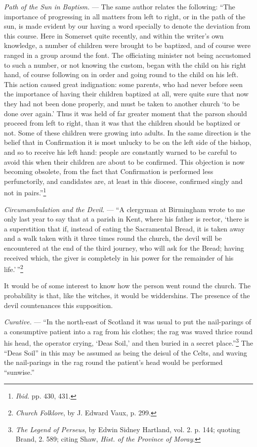 \documentclass[a4paper, 11pt, oneside, polutonikogreek, english]{article}
\begin{document}
\emph{Path of the Sun in Baptism.} --- The same author relates the following: ``The importance of progressing in all matters from left to right, or in the path of the sun, is made evident by our having a word specially to denote the deviation from this course. Here in Somerset quite recently, and within the writer's own knowledge, a number of children were brought to be baptized, and of course were ranged in a group around the font. The officiating minister not being accustomed to such a number, or not knowing the custom, began with the child on his right hand, of course following on in order and going round to the child on his left. This action caused great indignation: some parents, who had never before seen the importance of having their children baptized at all, were quite sure that now they had not been done properly, and must be taken to another church `to be done over again.' Thus it was held of far greater moment that the parson should proceed from left to right, than it was that the children should be baptized or not. Some of these children were growing into adults. In the same direction is the belief that in Confirmation it is most unlucky to be on the left side of the bishop, and so to receive his left hand: people are constantly warned to be careful to avoid this when their children are about to be confirmed. This objection is now becoming obsolete, from the fact that Confirmation is performed less perfunctorily, and candidates are, at least in this diocese, confirmed singly and not in pairs.''\footnote{\emph{Ibid.} pp. 430, 431.}

\emph{Circumambulation and the Devil.} --- ``A clergyman at Birmingham wrote to me only last year to say that at a parish in Kent, where his father is rector, `there is a superstition that if, instead of eating the Sacramental Bread, it is taken away and a walk taken with it three times round the church, the devil will be encountered at the end of the third journey, who will ask for the Bread; having received which, the giver is completely in his power for the remainder of his life.'\,''\footnote{\emph{Church Folklore}, by J. Edward Vaux, p. 299.}

It would be of some interest to know how the person went round the church. The probability is that, like the witches, it would be widdershins. The presence of the devil countenances this supposition.

\emph{Curative.} --- ``In the north-east of Scotland it was usual to put the nail-parings of a consumptive patient into a rag from his clothes; the rag was waved thrice round his head, the operator crying, `Deas Soil,' and then buried in a secret place.''\footnote{\emph{The Legend of Perseus}, by Edwin Sidney Hartland, vol. 2. p. 144; quoting Brand, 2. 589; citing Shaw, \emph{Hist. of the Province of Moray}.} The ``Deas Soil'' in this may be assumed as being the deisul of the Celts, and waving the nail-parings in the rag round the patient's head would be performed ``sunwise.''
\end{document}
